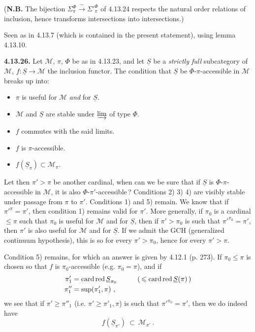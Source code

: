 \documentclass[11pt]{article}
\newcommand{\printedpage}[1]{\marginpar{\footnotesize p.~#1}}
\newcommand{\msp}[1]{\marginpar{\footnotesize [#1]}}
\newcommand{\cardred}{\mathop{\textup{card\,red}}\nolimits}
\begin{document}
(\textbf{N.B.} The bijection $\Sigma^{\Phi}_{\pi}\xrightarrow{\ \sim\ }{\Sigma'}^{\Phi}_{\pi}$ of 4.13.24 respects the natural order relations of inclusion, hence transforms intersections into intersections.)

Seen as in 4.13.7 (which is contained in the present statement), using lemma 4.13.10.

\textbf{4.13.26.} Let $\mathcal{M}$, $\pi$, $\Phi$ be as in 4.13.23, and let $\underline{S}$ be a \textit{strictly full} subcategory of $\mathcal{M}$, $f:\underline{S}\longrightarrow\mathcal{M}$ the inclusion functor. The condition that $\underline{S}$ be $\Phi$-$\pi$-accessible in $\mathcal{M}$ breaks up into:
\begin{itemize}[leftmargin=2.5em]
\item[1)] $\pi$ is useful for $\mathcal{M}$ \textit{and} for $\underline{S}$.
\item[2)] $\mathcal{M}$ and $\underline{S}$ are stable under $\varinjlim$ of type $\Phi$.
\item[3)] $f$ commutes with the said limits.
\item[4)] $f$ is $\pi$-accessible.
\item[5)] $f(\underline{S}_\pi)\subset\mathcal{M}_\pi$.
\end{itemize}

\printedpage{132}
\msp{page 347}
Let then $\pi'>\pi$ be another cardinal, when can we be sure that if $\underline{S}$ is $\Phi$-$\pi$-accessible in $\mathcal{M}$, it is also $\Phi$-$\pi'$-accessible\,? Conditions 2) 3) 4) are visibly stable under passage from $\pi$ to $\pi'$. Conditions 1) and 5) remain. We know that if $\pi'^{\pi}=\pi'$, then condition 1) remains valid for $\pi'$. More generally, if $\pi_0$ is a cardinal $\leqslant\pi$ such that $\pi_0$ is useful for $\mathcal{M}$ and for $\underline{S}$, then if $\pi'>\pi_0$ is such that $\pi'^{\pi_0}=\pi'$, then $\pi'$ is also useful for $\mathcal{M}$ and for $\underline{S}$. If we admit the GCH (generalized continuum hypothesis), this is so for every $\pi'>\pi_0$, hence for every $\pi'>\pi$.

Condition 5) remains, for which an answer is given by 4.12.1 (p. 273). If $\pi_0\leqslant\pi$ is chosen so that $f$ is $\pi_0$-accessible (e.g. $\pi_0=\pi$), and if
\[
\begin{aligned}
\pi'_1 &= \cardred\underline{S}_{\pi_0} \qquad\quad (\,\leqslant\cardred\underline{S}(\pi)\,)\\
\pi''_1 &= \sup(\pi'_1,\pi)\ ,
\end{aligned}
\]
we see that if $\pi'\geqslant\pi''_1$ (i.e. $\pi'\geqslant\pi'_1,\pi$) is such that $\pi'^{\pi_0}=\pi'$, then we do indeed have
\[ f(\underline{S}_{\pi'})\ \subset\ \mathcal{M}_{\pi'}\ . \]
\end{document}
